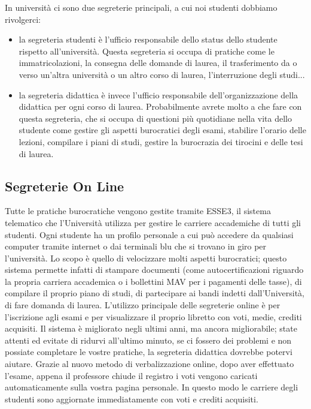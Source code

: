 In università ci sono due segreterie principali, a cui noi studenti dobbiamo rivolgerci:
\begin{itemize}
\item la segreteria studenti è l'ufficio responsabile dello status dello studente rispetto all'università. Questa segreteria si occupa di pratiche come le immatricolazioni, la consegna delle domande di laurea, il trasferimento da o verso un'altra università o un altro corso di laurea, l'interruzione degli studi...
\item la segreteria didattica è invece l'ufficio responsabile dell'organizzazione della didattica per ogni corso di laurea. Probabilmente avrete molto a che fare con questa segreteria, che si occupa di questioni più quotidiane nella vita dello studente come gestire gli aspetti burocratici degli esami, stabilire l'orario delle lezioni, compilare i piani di studi, gestire la burocrazia dei tirocini e delle tesi di laurea.
\end{itemize}

\subsection{Segreterie On Line}
Tutte le pratiche burocratiche vengono gestite tramite ESSE3, il sistema telematico che l'Università utilizza per gestire le carriere accademiche di tutti gli studenti. 
Ogni studente ha un profilo personale a cui può accedere da qualsiasi computer tramite internet o dai terminali blu che si trovano in giro per l'università. Lo scopo è quello di velocizzare molti aspetti burocratici; questo sistema permette infatti di stampare documenti (come autocertificazioni riguardo la propria carriera accademica o i bollettini MAV per i pagamenti delle tasse), di compilare il proprio piano di studi, di partecipare ai bandi indetti dall'Università, di fare domanda di laurea. L'utilizzo principale delle segreterie online è per l'iscrizione agli esami e per visualizzare il proprio libretto con voti, medie, crediti acquisiti. 
Il sistema è migliorato negli ultimi anni, ma ancora migliorabile; state attenti ed evitate di ridurvi all'ultimo minuto, se ci fossero dei problemi e non possiate completare le vostre pratiche, la segreteria didattica dovrebbe potervi aiutare.
Grazie al nuovo metodo di verbalizzazione online, dopo aver effettuato l'esame, appena il professore chiude il registro i voti vengono caricati automaticamente sulla vostra pagina personale. In questo modo le carriere degli studenti sono aggiornate immediatamente con voti e crediti acquisiti.

